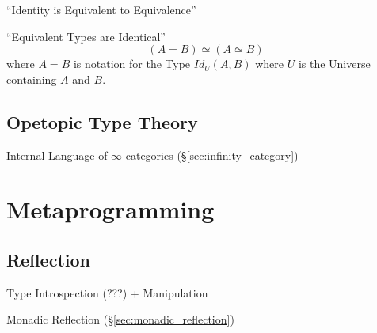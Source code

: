 ``Identity is Equivalent to Equivalence''

``Equivalent Types are Identical''
\[
  (A = B) \simeq (A \simeq B)
\]
where $A = B$ is notation for the Type $Id_U(A,B)$ where $U$ is the
Universe containing $A$ and $B$.



\subsection{Opetopic Type Theory}\label{sec:opetopic_typetheory}

Internal Language of $\infty$-categories
(\S\ref{sec:infinity_category})



\section{Metaprogramming}\label{sec:metaprogramming}

\subsection{Reflection}\label{sec:type_reflection}

Type Introspection (???) + Manipulation

Monadic Reflection (\S\ref{sec:monadic_reflection})
